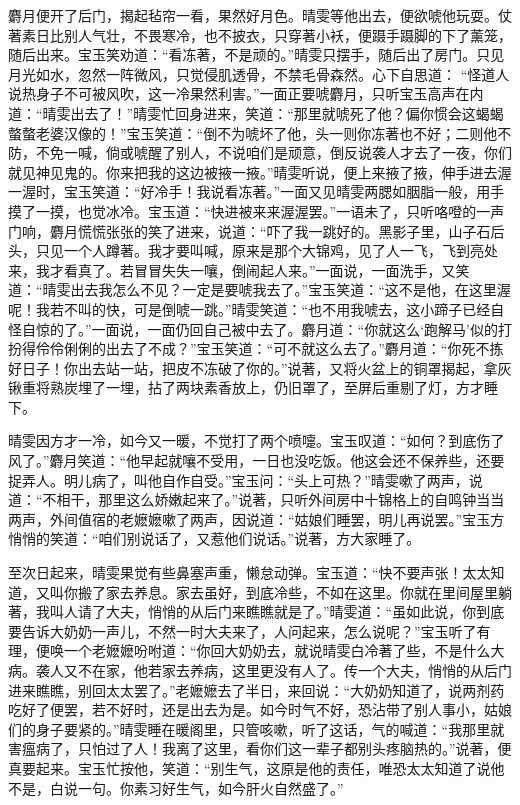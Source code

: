 \begin{parag}
    麝月便开了后门，揭起毡帘一看，果然好月色。晴雯等他出去，便欲唬他玩耍。仗著素日比别人气壮，不畏寒冷，也不披衣，只穿著小袄，便蹑手蹑脚的下了薰笼，随后出来。宝玉笑劝道：“看冻著，不是顽的。”晴雯只摆手，随后出了房门。只见月光如水，忽然一阵微风，只觉侵肌透骨，不禁毛骨森然。心下自思道： “怪道人说热身子不可被风吹，这一冷果然利害。”一面正要唬麝月，只听宝玉高声在内道：“晴雯出去了！”晴雯忙回身进来，笑道：“那里就唬死了他？偏你惯会这蝎蝎螫螫老婆汉像的！”宝玉笑道：“倒不为唬坏了他，头一则你冻著也不好；二则他不防，不免一喊，倘或唬醒了别人，不说咱们是顽意，倒反说袭人才去了一夜，你们就见神见鬼的。你来把我的这边被掖一掖。”晴雯听说，便上来掖了掖，伸手进去渥一渥时，宝玉笑道：“好冷手！我说看冻著。”一面又见晴雯两腮如胭脂一般，用手摸了一摸，也觉冰冷。宝玉道：“快进被来来渥渥罢。”一语未了，只听咯噔的一声门响，麝月慌慌张张的笑了进来，说道：“吓了我一跳好的。黑影子里，山子石后头，只见一个人蹲著。我才要叫喊，原来是那个大锦鸡，见了人一飞，飞到亮处来，我才看真了。若冒冒失失一嚷，倒闹起人来。”一面说，一面洗手，又笑道：“晴雯出去我怎么不见？一定是要唬我去了。”宝玉笑道：“这不是他，在这里渥呢！我若不叫的快，可是倒唬一跳。”晴雯笑道：“也不用我唬去，这小蹄子已经自怪自惊的了。”一面说，一面仍回自己被中去了。麝月道：“你就这么‘跑解马’似的打扮得伶伶俐俐的出去了不成？”宝玉笑道：“可不就这么去了。”麝月道：“你死不拣好日子！你出去站一站，把皮不冻破了你的。”说著，又将火盆上的铜罩揭起，拿灰锹重将熟炭埋了一埋，拈了两块素香放上，仍旧罩了，至屏后重剔了灯，方才睡下。
\end{parag}


\begin{parag}
    晴雯因方才一冷，如今又一暖，不觉打了两个喷嚏。宝玉叹道：“如何？到底伤了风了。”麝月笑道：“他早起就嚷不受用，一日也没吃饭。他这会还不保养些，还要捉弄人。明儿病了，叫他自作自受。”宝玉问：“头上可热？”晴雯嗽了两声，说道：“不相干，那里这么娇嫩起来了。”说著，只听外间房中十锦格上的自鸣钟当当两声，外间值宿的老嬷嬷嗽了两声，因说道：“姑娘们睡罢，明儿再说罢。”宝玉方悄悄的笑道：“咱们别说话了，又惹他们说话。”说著，方大家睡了。
\end{parag}


\begin{parag}
    至次日起来，晴雯果觉有些鼻塞声重，懒怠动弹。宝玉道：“快不要声张！太太知道，又叫你搬了家去养息。家去虽好，到底冷些，不如在这里。你就在里间屋里躺著，我叫人请了大夫，悄悄的从后门来瞧瞧就是了。”晴雯道：“虽如此说，你到底要告诉大奶奶一声儿，不然一时大夫来了，人问起来，怎么说呢？”宝玉听了有理，便唤一个老嬷嬷吩咐道：“你回大奶奶去，就说晴雯白冷著了些，不是什么大病。袭人又不在家，他若家去养病，这里更没有人了。传一个大夫，悄悄的从后门进来瞧瞧，别回太太罢了。”老嬷嬷去了半日，来回说：“大奶奶知道了，说两剂药吃好了便罢，若不好时，还是出去为是。如今时气不好，恐沾带了别人事小，姑娘们的身子要紧的。”晴雯睡在暖阁里，只管咳嗽，听了这话，气的喊道：“我那里就害瘟病了，只怕过了人！我离了这里，看你们这一辈子都别头疼脑热的。”说著，便真要起来。宝玉忙按他，笑道：“别生气，这原是他的责任，唯恐太太知道了说他不是，白说一句。你素习好生气，如今肝火自然盛了。”
\end{parag}


